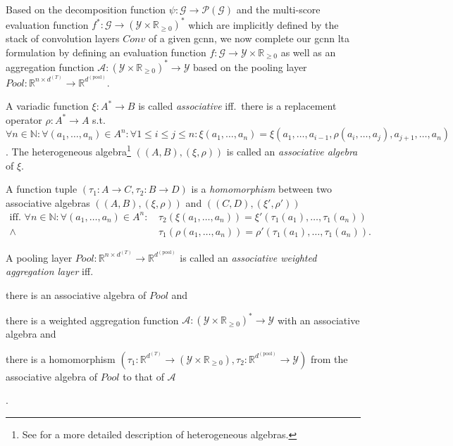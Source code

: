 Based on the decomposition function $\psi: \mathcal{G} \to \mathcal{P}(\mathcal{G})$ and the multi-score evaluation function $f^{*}: \mathcal{G} \to {(\mathcal{Y} \times \mathbb{R}_{\geq 0})}^{*}$ which are implicitly defined by the stack of convolution layers $\mathit{Conv}$ of a given \ac{gcnn}, we now complete our \ac{gcnn} \ac{lta} formulation by defining an evaluation function $f: \mathcal{G} \to \mathcal{Y} \times \mathbb{R}_{\geq 0}$ as well as an aggregation function $\mathcal{A}: {(\mathcal{Y} \times \mathbb{R}_{\geq 0})}^{*} \to \mathcal{Y}$ based on the pooling layer $\mathit{Pool}: \mathbb{R}^{n \times d^{(T)}} \to \mathbb{R}^{d^{(\mathrm{pool})}}$.
\begin{defn}\label{defn:ltag:assoc-algebra}
	A variadic function $\xi: A^{*} \to B$ is called \textit{associative} iff.\ there is a replacement operator $\rho: A^{*} \to A$ s.t.\ $\forall n \in \mathbb{N}: \forall (a_1, \dots, a_n) \in A^n: \forall {1 \leq i \leq j \leq n}: \xi(a_1, \dots, a_n) = \xi(a_1, \dots, a_{i-1}, \rho(a_i, \dots, a_j), a_{j+1}, \dots, a_n)$.
	The heterogeneous algebra\footnote{
		See \citet{Birkhoff1970} for a more detailed description of heterogeneous algebras.
	} $((A, B), (\xi, \rho))$ is called an \textit{associative algebra} of $\xi$.
\end{defn}
\begin{defn}\label{defn:ltag:assoc-algebra-homomorphism}
	A function tuple $(\tau_1: A \to C, \tau_2: B \to D)$ is a \textit{homomorphism} between two associative algebras $((A, B), (\xi, \rho))$ and $((C, D), (\xi', \rho'))$
	\begin{align*}
		\text{iff.\ }
		\forall n \in \mathbb{N}: \forall (a_1, \dots, a_n) \in A^n:
		\, &\tau_2(\xi(a_1, \dots, a_n)) = \xi'(\tau_1(a_1), \dots, \tau_1(a_n)) \\
		\land\, &\tau_1(\rho(a_1, \dots, a_n)) = \rho'(\tau_1(a_1), \dots, \tau_1(a_n)) %
		\text{.}
	\end{align*}
\end{defn}
\begin{defn}\label{defn:ltag:assoc-aggregation-pooling}
	A pooling layer $\mathit{Pool}: \mathbb{R}^{n \times d^{(T)}} \to \mathbb{R}^{d^{(\mathrm{pool})}}$ is called an \textit{associative weighted aggregation layer} iff.
	\begin{enumerate*}
		\item there is an associative algebra of $\mathit{Pool}$ and
		\item there is a weighted aggregation function $\mathcal{A}: {(\mathcal{Y} \times \mathbb{R}_{\geq 0})}^{*} \to \mathcal{Y}$ with an associative algebra and
		\item there is a homomorphism $(\tau_{1}: \mathbb{R}^{d^{(T)}} \to (\mathcal{Y} \times \mathbb{R}_{\geq 0}), \tau_{2}: \mathbb{R}^{d^{(\mathrm{pool})}} \to \mathcal{Y})$ from the associative algebra of $\mathit{Pool}$ to that of $\mathcal{A}$
	\end{enumerate*}.
\end{defn}
